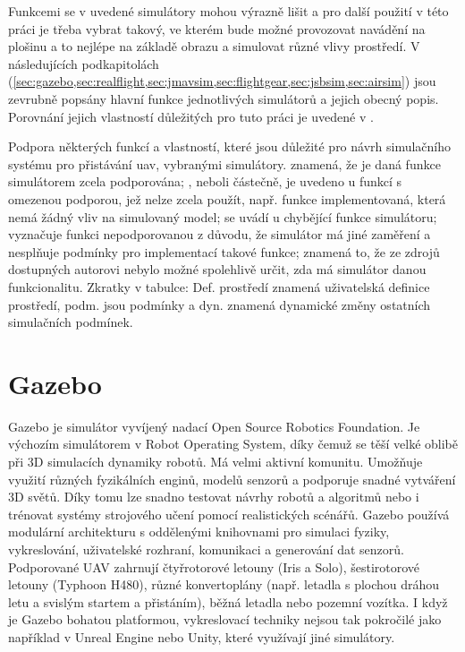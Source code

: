     Funkcemi se v  uvedené simulátory mohou výrazně lišit a pro další použití v této práci je třeba vybrat takový, ve kterém bude možné provozovat navádění na plošinu a to nejlépe na základě obrazu a simulovat různé vlivy prostředí. V následujících podkapitolách (\cref{sec:gazebo,sec:realflight,sec:jmavsim,sec:flightgear,sec:jsbsim,sec:airsim}) jsou zevrubně popsány hlavní funkce jednotlivých simulátorů a jejich obecný popis. Porovnání jejich vlastností důležitých pro tuto práci je uvedené v .

    \begin{table}
        \centering
        
        \caption[Vlastnosti vybraných simulátorů]{Podpora některých funkcí a vlastností, které jsou důležité pro návrh simulačního systému pro přistávání \acrshort{uav}, vybranými simulátory.  znamená, že je daná funkce simulátorem zcela podporována; , neboli částečně, je uvedeno u funkcí s omezenou podporou, jež nelze zcela použít, např. funkce implementovaná, která nemá žádný vliv na simulovaný model;  se uvádí u chybějící funkce simulátoru; \uv{-} vyznačuje funkci nepodporovanou z důvodu, že simulátor má jiné zaměření a nesplňuje podmínky pro implementací takové funkce;  znamená to, že ze zdrojů dostupných autorovi nebylo možné spolehlivě určit, zda má simulátor danou funkcionalitu. Zkratky v tabulce: Def. prostředí znamená uživatelská definice prostředí, podm. jsou podmínky a dyn. znamená dynamické změny ostatních simulačních podmínek.}
        \label{tab:simsfeatures}
    \end{table}

    \section{Gazebo} \label{sec:gazebo}
        Gazebo je simulátor vyvíjený nadací Open Source Robotics Foundation. Je výchozím simulátorem v Robot Operating System, díky čemuž se těší velké oblibě při 3D simulacích dynamiky robotů. Má velmi aktivní komunitu. Umožňuje využití různých fyzikálních enginů, modelů senzorů a podporuje snadné vytváření 3D světů. Díky tomu lze snadno testovat návrhy robotů a algoritmů nebo i trénovat systémy strojového učení pomocí realistických scénářů. Gazebo používá modulární architekturu s oddělenými knihovnami pro simulaci fyziky, vykreslování, uživatelské rozhraní, komunikaci a generování dat senzorů. Podporované UAV zahrnují čtyřrotorové letouny (Iris a Solo), šestirotorové letouny (Typhoon H480), různé konvertoplány (např. letadla s plochou dráhou letu a svislým startem a přistáním), běžná letadla nebo pozemní vozítka. I když je Gazebo bohatou platformou, vykreslovací techniky nejsou tak pokročilé jako například v Unreal Engine nebo Unity, které využívají jiné simulátory. \cite{Ebeid2018}
    
